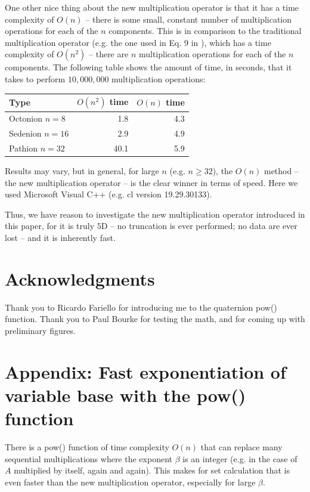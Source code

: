 \documentclass[12pt]{article}
\begin{document}
One other nice thing about the new multiplication operator is that it has a time complexity of $O(n)$ -- there is some small, constant number of multiplication operations for each of the $n$ components.
This is in comparison to the traditional multiplication operator (e.g. the one used in Eq. 9 in \cite{wang2}), which has a time complexity of $O(n^2)$ -- there are $n$ multiplication operations for each of the $n$ components.
The following table shows the amount of time, in seconds, that it takes to perform $10,000,000$ multiplication operations:
\begin{center}
\begin{tabular}{| l | r | r |}
  \hline
  Type & $O(n^2)$ time & $O(n)$ time \\
\hline
\hline
  Octonion $n = 8$ &1.8   &  4.3 \\
  Sedenion $n = 16$ & 2.9  & 4.9   \\
  Pathion $n = 32$ & 40.1  & 5.9   \\
  \hline  
\end{tabular}
\end{center}
Results may vary, but in general, for large $n$ (e.g. $n \geq 32$), the $O(n)$ method -- the new multiplication operator -- is the clear winner in terms of speed.
Here we used Microsoft Visual C++ (e.g. cl version 19.29.30133).

Thus, we have reason to investigate the new multiplication operator introduced in this paper, for it is truly $5$D -- no truncation is ever performed; no data are ever lost -- and it is inherently fast.


\section{Acknowledgments}

Thank you to Ricardo Fariello for introducing me to the quaternion pow() function.
Thank you to Paul Bourke for testing the math, and for coming up with preliminary figures.


\appendix





\section{Appendix: Fast exponentiation of variable base with the pow() function}

There is a pow() function of time complexity $O(n)$ that can replace many sequential multiplications where the exponent $\beta$ is an integer (e.g. in the case of $A$ multiplied by itself, again and again).
This makes for set calculation that is even faster than the new multiplication operator, especially for large $\beta$.
\end{document}
